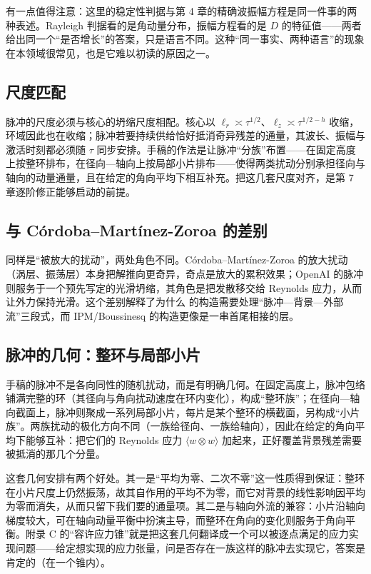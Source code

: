 有一点值得注意：这里的稳定性判据与第 4 章的精确波振幅方程是同一件事的两种表述。Rayleigh 判据看的是角动量分布，振幅方程看的是 $D$ 的特征值——两者给出同一个“是否增长”的答案，只是语言不同。这种“同一事实、两种语言”的现象在本领域很常见，也是它难以初读的原因之一。

\subsection{尺度匹配}

脉冲的尺度必须与核心的坍缩尺度相配。核心以 $\ell_{r}\asymp\tau^{1/2}$、$\ell_{z}\asymp\tau^{1/2-h}$ 收缩，环域因此也在收缩；脉冲若要持续供给恰好抵消奇异残差的通量，其波长、振幅与激活时刻都必须随 $\tau$ 同步安排。手稿的作法是让脉冲“分族”布置——在固定高度上按整环排布，在径向—轴向上按局部小片排布——使得两类扰动分别承担径向与轴向的动量通量，且在给定的角向平均下相互补充。把这几套尺度对齐，是第 7 章逐阶修正能够启动的前提。

\subsection{与 Córdoba--Martínez-Zoroa 的差别}

同样是“被放大的扰动”，两处角色不同。Córdoba--Martínez-Zoroa 的放大扰动（涡层、振荡层）本身把解推向更奇异，奇点是放大的累积效果；OpenAI 的脉冲则服务于一个预先写定的光滑坍缩，其角色是把发散移交给 Reynolds 应力，从而让外力保持光滑。这个差别解释了为什么 \NS{} 的构造需要处理“脉冲—背景—外部流”三段式，而 IPM/Boussinesq 的构造更像是一串首尾相接的层。

\subsection{脉冲的几何：整环与局部小片}

手稿的脉冲不是各向同性的随机扰动，而是有明确几何。在固定高度上，脉冲包络铺满完整的环（其径向与角向扰动速度在环内变化），构成“整环族”；在径向—轴向截面上，脉冲则聚成一系列局部小片，每片是某个整环的横截面，另构成“小片族”。两族扰动的极化方向不同（一族给径向、一族给轴向），因此在给定的角向平均下能够互补：把它们的 Reynolds 应力 $\langle w\otimes w\rangle$ 加起来，正好覆盖背景残差需要被抵消的那几个分量。

这套几何安排有两个好处。其一是“平均为零、二次不零”这一性质得到保证：整环在小片尺度上仍然振荡，故其自作用的平均不为零，而它对背景的线性影响因平均为零而消失，从而只留下我们要的通量项。其二是与轴向外流的兼容：小片沿轴向梯度较大，可在轴向动量平衡中扮演主导，而整环在角向的变化则服务于角向平衡。附录 C 的“容许应力锥”就是把这套几何翻译成一个可以被逐点满足的应力实现问题——给定想实现的应力张量，问是否存在一族这样的脉冲去实现它，答案是肯定的（在一个锥内）。

